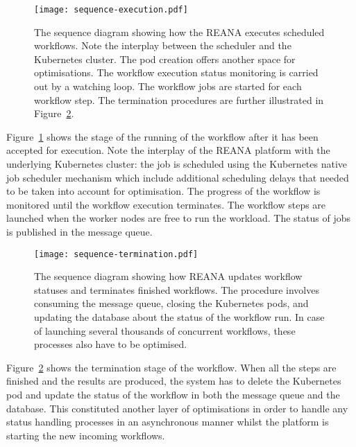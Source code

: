 \begin{figure}
\centering
\texttt{[image: sequence-execution.pdf]}
\caption{The sequence diagram showing how the REANA executes scheduled workflows.
Note the interplay between the scheduler and the Kubernetes cluster.
The pod creation offers another space for optimisations.
The workflow execution status monitoring is carried out by a watching loop.
The workflow jobs are started for each workflow step.
The termination procedures are further illustrated in Figure~\ref{fig:reanascheduler4}.}
\label{fig:reanascheduler3}
\end{figure}

Figure~\ref{fig:reanascheduler3} shows the stage of the running of the workflow after it has been accepted for execution.
Note the interplay of the REANA platform with the underlying Kubernetes cluster: the job is scheduled using the Kubernetes native job scheduler mechanism which include additional scheduling delays that needed to be taken into account for optimisation.
The progress of the workflow is monitored until the workflow execution terminates.
The workflow steps are launched when the worker nodes are free to run the workload.
The status of jobs is published in the message queue.

\begin{figure}
\centering
\texttt{[image: sequence-termination.pdf]}
\caption{The sequence diagram showing how REANA updates workflow statuses and terminates finished workflows.
The procedure involves consuming the message queue, closing the Kubernetes pods, and updating the database about the status of the workflow run.
In case of launching several thousands of concurrent workflows, these processes also have to be optimised.}
\label{fig:reanascheduler4}
\end{figure}

Figure~\ref{fig:reanascheduler4} shows the termination stage of the workflow.
When all the steps are finished and the results are produced, the system has to delete the Kubernetes pod and update the status of the workflow in both the message queue and the database.
This constituted another layer of optimisations in order to handle any status handling processes in an asynchronous manner whilst the platform is starting the new incoming workflows.
